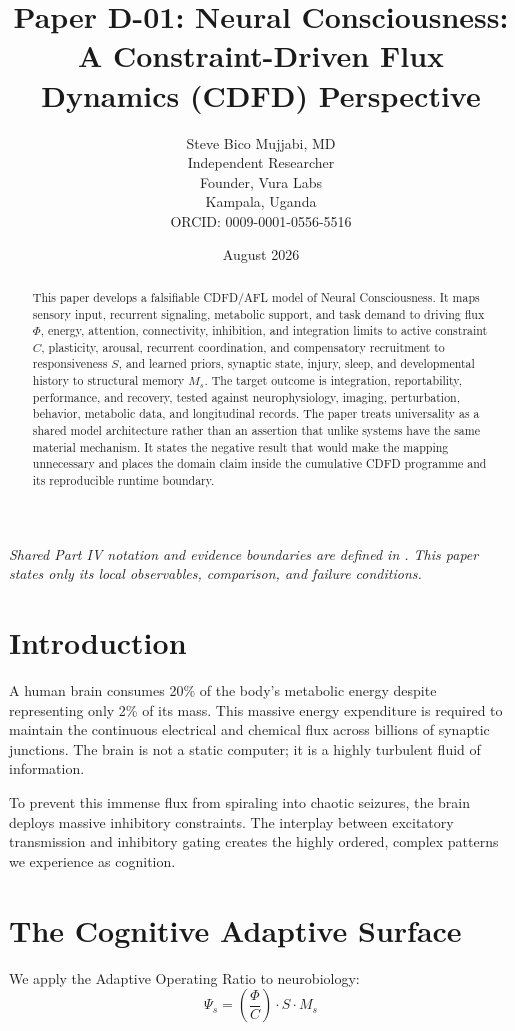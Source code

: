 \documentclass[11pt,a4paper]{article}
\title{\textbf{Paper D-01: Neural Consciousness:\\ A Constraint-Driven Flux Dynamics (CDFD) Perspective}}
\author{Steve Bico Mujjabi, MD\\
\small Independent Researcher\\
\small Founder, Vura Labs\\
\small Kampala, Uganda\\
\small ORCID: 0009-0001-0556-5516}
\date{August 2026}
\begin{document}
\maketitle

\noindent\textit{Shared Part IV notation and evidence boundaries are defined in . This paper states only its local observables, comparison, and failure conditions.}


\begin{abstract}
This paper develops a falsifiable CDFD/AFL model of Neural Consciousness. It maps sensory input, recurrent signaling, metabolic support, and task demand to driving flux $\Phi$, energy, attention, connectivity, inhibition, and integration limits to active constraint $C$, plasticity, arousal, recurrent coordination, and compensatory recruitment to responsiveness $S$, and learned priors, synaptic state, injury, sleep, and developmental history to structural memory $M_s$. The target outcome is integration, reportability, performance, and recovery, tested against neurophysiology, imaging, perturbation, behavior, metabolic data, and longitudinal records. The paper treats universality as a shared model architecture rather than an assertion that unlike systems have the same material mechanism. It states the negative result that would make the mapping unnecessary and places the domain claim inside the cumulative CDFD programme and its reproducible runtime boundary.
\end{abstract}

\section{Introduction}

A human brain consumes 20\% of the body's metabolic energy despite representing only 2\% of its mass. This massive energy expenditure is required to maintain the continuous electrical and chemical flux across billions of synaptic junctions. The brain is not a static computer; it is a highly turbulent fluid of information.

To prevent this immense flux from spiraling into chaotic seizures, the brain deploys massive inhibitory constraints. The interplay between excitatory transmission and inhibitory gating creates the highly ordered, complex patterns we experience as cognition.

\section{The Cognitive Adaptive Surface}
We apply the Adaptive Operating Ratio to neurobiology:
\begin{equation}
    \Psi_s = \left( \frac{\Phi}{C} \right) \cdot S \cdot M_s
\end{equation}
\end{document}
